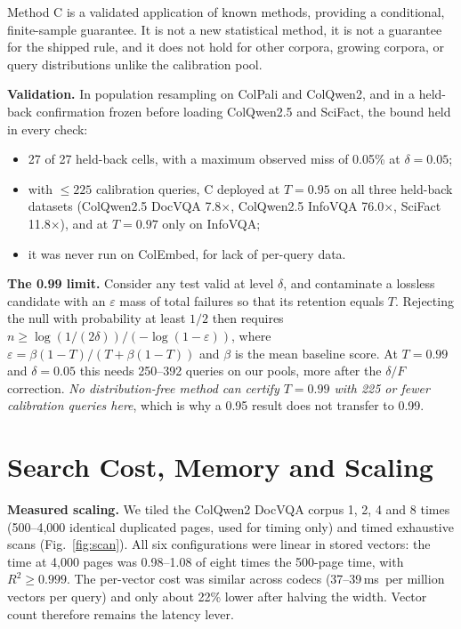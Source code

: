 \documentclass[conference]{IEEEtran}
\newcommand{\ms}{\,ms}
\begin{document}
Method C is a validated application of known methods, providing a conditional,
finite-sample guarantee. It is not a new statistical method, it is not a guarantee for
the shipped rule, and it does not hold for other corpora, growing corpora, or query
distributions unlike the calibration pool.

\textbf{Validation.} In population resampling on ColPali and ColQwen2, and in a
held-back confirmation frozen before loading ColQwen2.5 and SciFact, the bound held in
every check:
\begin{itemize}
\item 27 of 27 held-back cells, with a maximum observed miss of 0.05\% at $\delta=0.05$;
\item with $\le 225$ calibration queries, C deployed at $T=0.95$ on all three held-back
datasets (ColQwen2.5 DocVQA 7.8$\times$, ColQwen2.5 InfoVQA 76.0$\times$, SciFact
11.8$\times$), and at $T=0.97$ only on InfoVQA;
\item it was never run on ColEmbed, for lack of per-query data.
\end{itemize}

\textbf{The 0.99 limit.} Consider any test valid at level $\delta$, and contaminate a
lossless candidate with an $\varepsilon$ mass of total failures so that its retention
equals $T$. Rejecting the null with probability at least $1/2$ then requires
$n\ge \log(1/(2\delta))/(-\log(1-\varepsilon))$, where
$\varepsilon=\beta(1-T)/(T+\beta(1-T))$ and $\beta$ is the mean baseline score. At
$T=0.99$ and $\delta=0.05$ this needs 250--392 queries on our pools, more after the
$\delta/F$ correction. \emph{No distribution-free method can certify $T=0.99$ with 225
or fewer calibration queries here}, which is why a 0.95 result does not transfer to
0.99.

\section{Search Cost, Memory and Scaling}
\label{sec:scale}

\textbf{Measured scaling.} We tiled the ColQwen2 DocVQA corpus 1, 2, 4 and 8 times
(500--4,000 identical duplicated pages, used for timing only) and timed exhaustive scans
(Fig.~\ref{fig:scan}). All six configurations were linear in stored vectors: the time at
4,000 pages was 0.98--1.08 of eight times the 500-page time, with $R^2\ge 0.999$. The
per-vector cost was similar across codecs (37--39\ms\ per million vectors per query) and
only about 22\% lower after halving the width. Vector count therefore remains the
latency lever.
\end{document}
